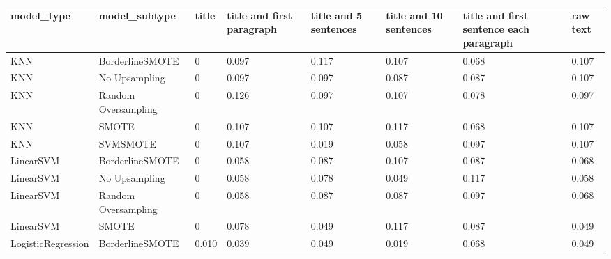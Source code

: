 \begin{tabular}{llllllll}
\toprule
                  model\_type &       model\_subtype & title & title and first paragraph & title and 5 sentences & title and 10 sentences & title and first sentence each paragraph & raw text \\
\midrule
                         KNN &     BorderlineSMOTE &     0 &                     0.097 &                 0.117 &                  0.107 &                                   0.068 &    0.107 \\
                         KNN &       No Upsampling &     0 &                     0.097 &                 0.097 &                  0.087 &                                   0.087 &    0.107 \\
                         KNN & Random Oversampling &     0 &                     0.126 &                 0.097 &                  0.107 &                                   0.078 &    0.097 \\
                         KNN &               SMOTE &     0 &                     0.107 &                 0.107 &                  0.117 &                                   0.068 &    0.107 \\
                         KNN &            SVMSMOTE &     0 &                     0.107 &                 0.019 &                  0.058 &                                   0.097 &    0.107 \\
                   LinearSVM &     BorderlineSMOTE &     0 &                     0.058 &                 0.087 &                  0.107 &                                   0.087 &    0.068 \\
                   LinearSVM &       No Upsampling &     0 &                     0.058 &                 0.078 &                  0.049 &                                   0.117 &    0.058 \\
                   LinearSVM & Random Oversampling &     0 &                     0.058 &                 0.087 &                  0.087 &                                   0.097 &    0.068 \\
                   LinearSVM &               SMOTE &     0 &                     0.078 &                 0.049 &                  0.117 &                                   0.087 &    0.049 \\
          LogisticRegression &     BorderlineSMOTE & 0.010 &                     0.039 &                 0.049 &                  0.019 &                                   0.068 &    0.049 \\

\end{tabular}
